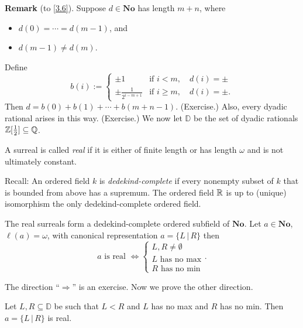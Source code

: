 
\textbf{Remark} (to \eqref{3.6}). Suppose $d\in\mathbf{No}$ has length $m+n$, where
\begin{itemize}
\item $d(0) = \cdots = d(m-1)$, and
\item $d(m-1)\ne d(m)$.
\end{itemize}
Define
\[ b(i) := \begin{cases} \pm 1 & \text{if } i< m, \quad d(i)=\pm \\
\pm \frac{1}{2^{i-m+1}} & \text{if } i \ge m, \quad d(i) = \pm.
\end{cases} \]
Then $d = b(0) + b(1) + \cdots + b(m+n-1)$. (Exercise.) Also, every dyadic rational arises in this way. (Exercise.)
We now let $\mathbb{D}$ be the set of dyadic rationals $\mathbb{Z}[\frac12]\subseteq\mathbb{Q}$.

\begin{defn}
A surreal is called {\em real} if it is either of finite length or has length $\omega$ and is not ultimately constant.
\end{defn}

Recall: An ordered field $k$ is {\em dedekind-complete} if every nonempty subset of $k$ that is bounded from above
has a supremum. The ordered field $\mathbb{R}$ is up to (unique) isomorphism the only dedekind-complete ordered field.

\begin{theorem}[Conway] \label{3.8}
The real surreals form a dedekind-complete ordered subfield of $\mathbf{No}$. Let $a\in\mathbf{No}$, $\ell(a)=\omega$,
with canonical representation $a = \{L \,|\, R\}$ then
\[ a\text{ is real } \iff \begin{cases} L,R\neq\emptyset \\
L\text{ has no max} \\
R\text{ has no min}
\end{cases}.\]
\end{theorem}

The direction ``$\Rightarrow$'' is an exercise. Now we prove the other direction.

\begin{lemma} \label{3.9}
Let $L,R\subseteq\mathbb{D}$ be such that $L<R$ and $L$ has no max and $R$ has no min. Then $a = \{ L \,|\, R\}$ is real.
\end{lemma}

